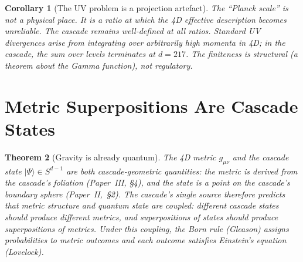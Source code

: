 \documentclass[12pt,a4paper]{article}
\newtheorem{theorem}{Theorem}[section]
\newtheorem{corollary}[theorem]{Corollary}
\begin{document}
\begin{corollary}[The UV problem is a projection artefact]
The ``Planck scale'' is not a physical place. It is a ratio at which the 4D
effective description becomes unreliable. The cascade remains well-defined
at all ratios. Standard UV divergences arise from integrating over
arbitrarily high momenta in 4D; in the cascade, the sum over levels
terminates at $d = 217$. The finiteness is structural (a theorem about the
Gamma function), not regulatory.
\end{corollary}

\section{Metric Superpositions Are Cascade States}

\begin{theorem}[Gravity is already quantum]\label{thm:metricstate}
The 4D metric $g_{\mu\nu}$ and the cascade state
$|\Psi\rangle \in S^{d-1}$ are both cascade-geometric quantities: the
metric is derived from the cascade's foliation (Paper~III, \S4), and the
state is a point on the cascade's boundary sphere (Paper~II,~\S2). The
cascade's single source therefore predicts that metric structure and
quantum state are coupled: different cascade states should produce
different metrics, and superpositions of states should produce
superpositions of metrics. Under this coupling, the Born rule (Gleason)
assigns probabilities to metric outcomes and each outcome satisfies
Einstein's equation (Lovelock).
\end{theorem}
\end{document}
